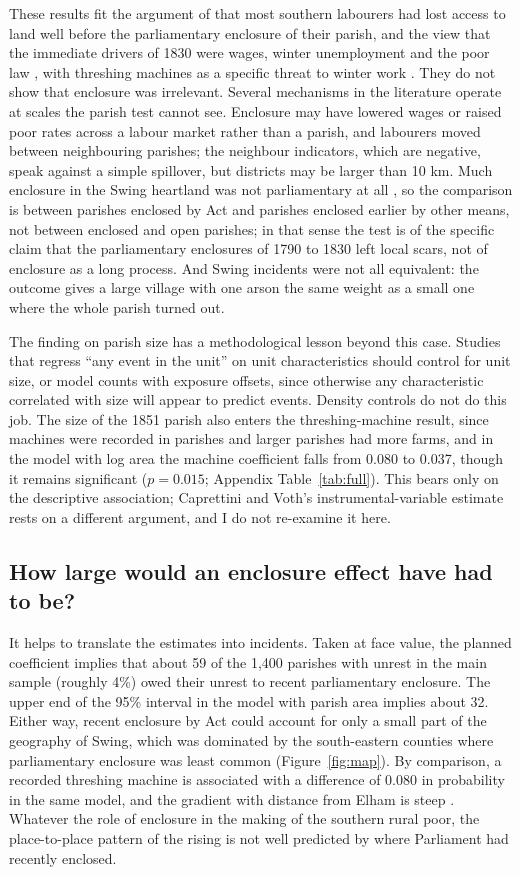 \documentclass[11pt,a4paper]{article}
\begin{document}
These results fit the argument of \citet{shawtaylor2001} that most southern labourers had lost access to land well before the parliamentary enclosure of their parish, and the view that the immediate drivers of 1830 were wages, winter unemployment and the poor law \citep{snell1985,boyer1990}, with threshing machines as a specific threat to winter work \citep{caprettinivoth2020}. They do not show that enclosure was irrelevant. Several mechanisms in the literature operate at scales the parish test cannot see. Enclosure may have lowered wages or raised poor rates across a labour market rather than a parish, and labourers moved between neighbouring parishes; the neighbour indicators, which are negative, speak against a simple spillover, but districts may be larger than 10 km. Much enclosure in the Swing heartland was not parliamentary at all \citep{wordie1983}, so the comparison is between parishes enclosed by Act and parishes enclosed earlier by other means, not between enclosed and open parishes; in that sense the test is of the specific claim that the parliamentary enclosures of 1790 to 1830 left local scars, not of enclosure as a long process. And Swing incidents were not all equivalent: the outcome gives a large village with one arson the same weight as a small one where the whole parish turned out.

The finding on parish size has a methodological lesson beyond this case. Studies that regress ``any event in the unit'' on unit characteristics should control for unit size, or model counts with exposure offsets, since otherwise any characteristic correlated with size will appear to predict events. Density controls do not do this job. The size of the 1851 parish also enters the threshing-machine result, since machines were recorded in parishes and larger parishes had more farms, and in the model with log area the machine coefficient falls from 0.080 to 0.037, though it remains significant ($p=0.015$; Appendix Table~\ref{tab:full}). This bears only on the descriptive association; Caprettini and Voth's instrumental-variable estimate rests on a different argument, and I do not re-examine it here.

\subsection{How large would an enclosure effect have had to be?}
It helps to translate the estimates into incidents. Taken at face value, the planned coefficient implies that about 59 of the 1,400 parishes with unrest in the main sample (roughly 4\%) owed their unrest to recent parliamentary enclosure. The upper end of the 95\% interval in the model with parish area implies about 32. Either way, recent enclosure by Act could account for only a small part of the geography of Swing, which was dominated by the south-eastern counties where parliamentary enclosure was least common (Figure~\ref{fig:map}). By comparison, a recorded threshing machine is associated with a difference of 0.080 in probability in the same model, and the gradient with distance from Elham is steep \citep{caprettinivoth2020}. Whatever the role of enclosure in the making of the southern rural poor, the place-to-place pattern of the rising is not well predicted by where Parliament had recently enclosed.
\end{document}
